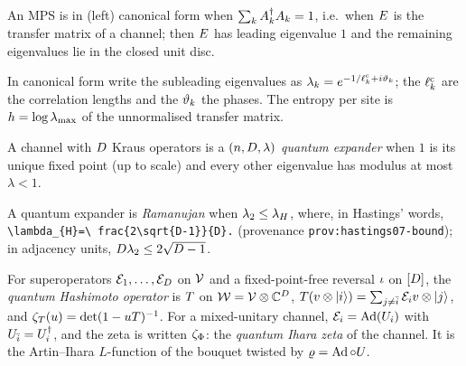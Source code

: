 \begin{definition}
\label{def:canonical-form}
An MPS is in (left) canonical form when $\sum_kA_{k}^\dagger A_{k} = 1$,
i.e.\ when $E$ is the transfer matrix of a channel; then $E$ has
leading eigenvalue $1$ and the remaining eigenvalues lie in the closed unit
disc.
\end{definition}

\begin{definition}
\label{def:correlation-length}
In canonical form write the subleading eigenvalues as $\lambda_k =
e^{-1/\ell^{\mathrm{c}}_{k}+i\vartheta_{k}}$; the $\ell^{\mathrm{c}}_{k}$ are the correlation
lengths and the $\vartheta_{k}$ the phases. The entropy per site is $h =
\log\lambda_{\max}$ of the unnormalised transfer matrix.
\end{definition}

\begin{definition}
\label{def:quantum-expander}
A channel with $D$ Kraus operators is a $(n,D,\lambda)$ \emph{quantum
expander} when $1$ is its unique fixed point (up to scale) and every other
eigenvalue has modulus at most $\lambda<1$.
\end{definition}

\begin{definition}
\label{def:ramanujan-channel}
A quantum expander is \emph{Ramanujan} when $\lambda_2\le\lambda_H$, where, in
Hastings' words, \texttt{\textbackslash lambda\_\{H\}=\textbackslash
frac\{2\textbackslash sqrt\{D-1\}\}\{D\}.} (provenance
\texttt{prov:hastings07-bound}); in adjacency units, $D\lambda_2\le2\sqrt{D-1}$.
\end{definition}

\begin{definition}
\label{def:quantum-hashimoto}
For superoperators $\mathcal E_{1},\dots,\mathcal E_{D}$ on $\mathcal V$ and a fixed-point-free
reversal $\iota$ on $[D]$, the \emph{quantum Hashimoto operator} is
$T$ on $\mathcal W = \mathcal V\otimes\mathbb C^{D}$, $T(v\otimes|i\rangle) =
\sum_{j\ne\bar{i}}\mathcal E_{i}v\otimes|j\rangle$, and $\zeta_{T}(u) =
\det(1-uT)^{-1}$. For a mixed-unitary channel, $\mathcal E_{i} = \operatorname{Ad}(U_{i})$
with $U_{\bar{i}} = U_{i}^\dagger$, and the zeta is written $\zeta_{\Phi}$: the
\emph{quantum Ihara zeta} of the channel. It is the Artin--Ihara $L$-function
of the bouquet twisted by $\varrho = \operatorname{Ad}\circ U_{}$.
\end{definition}
